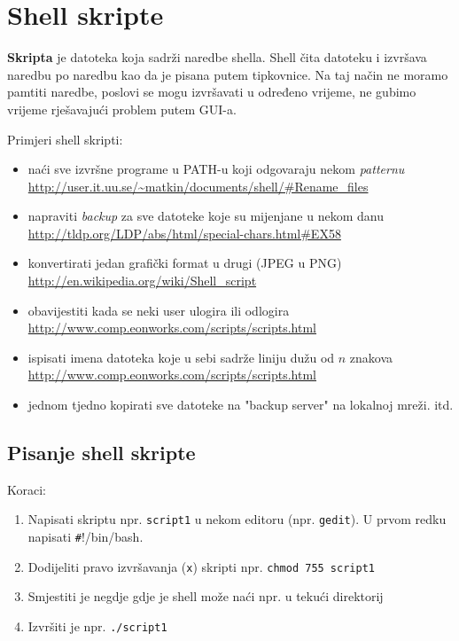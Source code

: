 \section{Shell skripte}

\textbf{Skripta} je datoteka koja sadrži naredbe shella. Shell čita datoteku i izvršava naredbu po naredbu kao da je pisana putem tipkovnice. Na taj način ne moramo pamtiti naredbe, poslovi se mogu izvršavati u određeno vrijeme, ne gubimo vrijeme rješavajući problem putem GUI-a.

\begin{primjer} Primjeri shell skripti: 
\begin{itemize}
\item  naći sve izvršne programe u PATH-u koji odgovaraju nekom \textit{patternu} \url{http://user.it.uu.se/~matkin/documents/shell/#Rename_files}
\item  napraviti \textit{backup} za sve datoteke koje su mijenjane u nekom danu \url{http://tldp.org/LDP/abs/html/special-chars.html#EX58}
\item  konvertirati jedan grafički format u drugi (JPEG u PNG) \url{http://en.wikipedia.org/wiki/Shell_script}
\item  obavijestiti kada se neki user ulogira ili odlogira \url{http://www.comp.eonworks.com/scripts/scripts.html}
\item ispisati imena datoteka koje u sebi sadrže liniju dužu od $n$ znakova \url{http://www.comp.eonworks.com/scripts/scripts.html}
\item jednom tjedno kopirati sve datoteke na "backup server" na lokalnoj mreži.
itd.
\end{itemize}
\end{primjer}

\subsection*{Pisanje shell skripte}
Koraci:
\begin{enumerate}
 \item Napisati skriptu npr. \texttt{script1} u nekom editoru (npr. \texttt{gedit}). U prvom redku napisati \lstinline!#!!/bin/bash.
\item Dodijeliti pravo izvršavanja (\texttt{x}) skripti npr. \lstinline!chmod 755 script1!
\item Smjestiti je negdje gdje je shell može naći npr. u tekući direktorij 
\item Izvršiti je npr. \texttt{./script1}
\end{enumerate}

